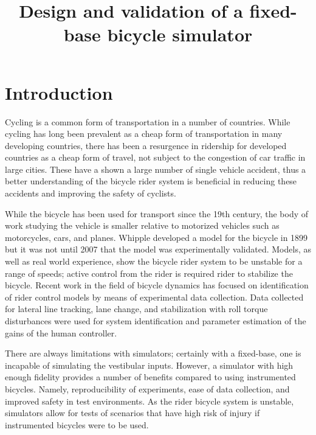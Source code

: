 \documentclass[11pt,a4paper]{amsart}
\title{Design and validation of a fixed-base bicycle simulator}
\begin{document}
\maketitle

\section{Introduction}
Cycling is a common form of transportation in a number of countries.
While cycling has long been prevalent as a cheap form of transportation in many developing countries,
there has been a resurgence in ridership for developed countries as a cheap form of travel,
not subject to the congestion of car traffic in large cities.
These have a shown a large number of single vehicle accident, thus a better understanding of the bicycle rider system is
beneficial in reducing these accidents and improving the safety of cyclists.

While the bicycle has been used for transport since the 19th century\cite{wilson2004}, the body of work studying the
vehicle is smaller relative to motorized vehicles such as motorcycles, cars, and planes.
Whipple developed a model for the bicycle in 1899\cite{whipple1899} but it was not until 2007 that the model was
experimentally validated\cite{kooijman2008}.
Models, as well as real world experience, show the bicycle rider system to be unstable for a range of speeds;
active control from the rider is required rider to stabilize the bicycle.
Recent work in the field of bicycle dynamics has focused on identification of rider control
models by means of experimental data collection\cite{delange2011,hess2012,hladun2015}.
Data collected for lateral line tracking\cite{delange2011,hess2012}, lane change\cite{hladun2015}, and stabilization
with roll torque disturbances\cite{delange2011,hess2012} were used for system identification and parameter estimation of
the gains of the human controller.

There are always limitations with simulators;
certainly with a fixed-base, one is incapable of simulating the vestibular inputs.
However, a simulator with high enough fidelity provides a number of benefits compared to using instrumented bicycles.
Namely, reproducibility of experiments, ease of data collection, and improved safety in test environments.
As the rider bicycle system is unstable, simulators allow for tests of scenarios that have high risk of injury if
instrumented bicycles were to be used.
\end{document}
